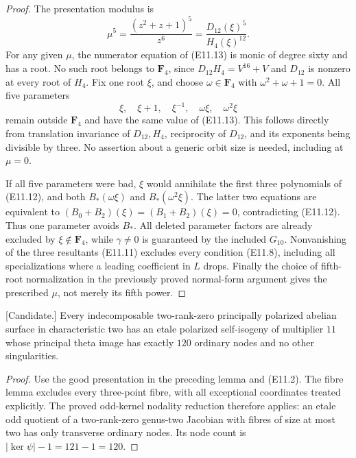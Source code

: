 \begin{proof}
The presentation modulus is
\[
 \mu^5=\frac{(z^2+z+1)^5}{z^6}
       =\frac{D_{12}(\xi)^5}{H_4(\xi)^{12}}.                  \tag{E11.13}
\]
For any given $\mu$, the numerator equation of (E11.13) is monic of
degree sixty and has a root. No such root belongs to $\mathbf F_4$,
since $D_{12}H_4=V^{16}+V$ and $D_{12}$ is nonzero at every root
of $H_4$. Fix one root $\xi$, and choose
$\omega\in\mathbf F_4$ with $\omega^2+\omega+1=0$.
All five parameters
\[
             \xi,\quad \xi+1,\quad \xi^{-1},
                    \quad \omega\xi,\quad \omega^2\xi
\]
remain outside $\mathbf F_4$ and have the same value of (E11.13).
This follows directly from translation invariance of $D_{12},H_4$,
reciprocity of $D_{12}$, and its exponents being divisible by three.
No assertion about a generic orbit size is needed, including at
$\mu=0$.

If all five parameters were bad, $\xi$ would annihilate the first
three polynomials of (E11.12), and both $B_*(\omega\xi)$ and
$B_*(\omega^2\xi)$. The latter two equations are equivalent to
$(B_0+B_2)(\xi)=(B_1+B_2)(\xi)=0$, contradicting (E11.12).
Thus one parameter avoids $B_*$. All deleted parameter factors are
already excluded by $\xi\notin\mathbf F_4$, while $\gamma\ne0$
is guaranteed by the included $G_{10}$. Nonvanishing of the three
resultants (E11.11) excludes every condition (E11.8), including all
specializations where a leading coefficient in $L$ drops.
Finally the choice of fifth-root normalization in the previously
proved normal-form argument gives the prescribed $\mu$, not merely
its fifth power.
\end{proof}

\begin{theorem}
\label{thm:uniform-eleven-nodal-self-isogeny-candidate}
\textup{[Candidate.]}
Every indecomposable two-rank-zero principally polarized abelian surface
in characteristic two has an etale polarized self-isogeny of multiplier
$11$ whose principal theta image has exactly $120$ ordinary nodes and
no other singularities.
\end{theorem}
\begin{proof}
Use the good presentation in the preceding lemma and (E11.2).
The fibre lemma excludes every three-point fibre, with all exceptional
coordinates treated explicitly. The proved odd-kernel nodality reduction
therefore applies: an etale odd quotient of a two-rank-zero genus-two
Jacobian with fibres of size at most two has only transverse ordinary
nodes. Its node count is $|\ker\psi|-1=121-1=120$.
\end{proof}

